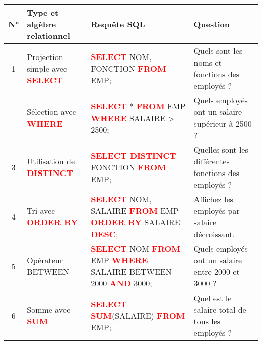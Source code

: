 \documentclass[a4paper, landscape]{article}
\begin{document}
\scriptsize %

\begin{longtable}{|c|l|p{}|p{}|}
    \hline
    \textbf{N°} & \textbf{Type et algèbre relationnel} & \textbf{Requête SQL} & \textbf{Question} \\
    \hline
    1 & Projection simple avec \textcolor{red}{\textbf{SELECT}} & \textcolor{red}{\textbf{SELECT}} NOM, FONCTION \textcolor{red}{\textbf{FROM}} EMP; \newline \newline & Quels sont les noms et fonctions des employés ? \\
    \hline
    \newline
    2 & Sélection avec \textcolor{red}{\textbf{WHERE}} & \textcolor{red}{\textbf{SELECT}} * \textcolor{red}{\textbf{FROM}} EMP \textcolor{red}{\textbf{WHERE}} SALAIRE > 2500; \newline \newline & Quels employés ont un salaire supérieur à 2500 ? \\
    \hline
    3 & Utilisation de \textcolor{red}{\textbf{DISTINCT}} & \textcolor{red}{\textbf{SELECT DISTINCT}} FONCTION \textcolor{red}{\textbf{FROM}} EMP; \newline \newline & Quelles sont les différentes fonctions des employés ? \\
    \hline
    4 & Tri avec \textcolor{red}{\textbf{ORDER BY}} & \textcolor{red}{\textbf{SELECT}} NOM, SALAIRE \textcolor{red}{\textbf{FROM}} EMP \textcolor{red}{\textbf{ORDER BY}} SALAIRE \textcolor{red}{\textbf{DESC}}; \newline \newline & Affichez les employés par salaire décroissant. \\
    \hline
    5 & Opérateur BETWEEN & \textcolor{red}{\textbf{SELECT}} NOM \textcolor{red}{\textbf{FROM}} EMP \textcolor{red}{\textbf{WHERE}} SALAIRE BETWEEN 2000 \textcolor{red}{\textbf{AND}} 3000; \newline \newline & Quels employés ont un salaire entre 2000 et 3000 ? \\
    \hline
    6 & Somme avec \textcolor{red}{\textbf{SUM}} & \textcolor{red}{\textbf{SELECT SUM}}(SALAIRE) \textcolor{red}{\textbf{FROM}} EMP; \newline \newline  & Quel est le salaire total de tous les employés ? \\

\end{longtable}
\end{document}
